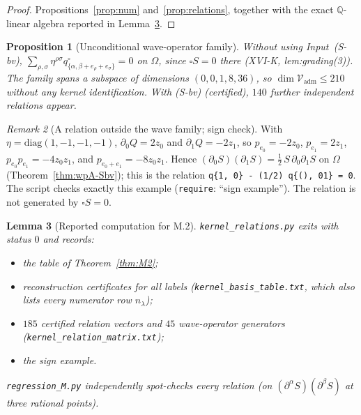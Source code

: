 \documentclass{article}
\newtheorem{proposition}{Proposition}
\newtheorem{lemma}[proposition]{Lemma}
\theoremstyle{remark}
\newtheorem{remark}[proposition]{Remark}
\begin{document}
\begin{proof}
Propositions~\ref{prop:num} and~\ref{prop:relations}, together with the exact $\mathbb Q$-linear algebra reported in Lemma~\ref{lem:M2comp}.
\end{proof}

\begin{proposition}[Unconditional wave-operator family]
\label{prop:wave}
Without using Input~(S-bv), $\sum_{\rho,\sigma}\eta^{\rho\sigma}q^\circ_{\{\alpha,\beta+e_\rho+e_\sigma\}}=0$ on $\Omega$, since $\square S=0$ there (XVI-K, lem:grading(3)).
The family spans a subspace of dimensions $(0,0,1,8,36)$, so $\dim\mathcal V_{\mathrm{adm}}\le210$ without any kernel identification.
With (S-bv) (certified), $140$ further independent relations appear.
\end{proposition}

\begin{remark}[A relation outside the wave family; sign check]
With $\eta=\mathrm{diag}(1,-1,-1,-1)$, $\partial_0Q=2z_0$ and $\partial_1Q=-2z_1$, so $p_{e_0}=-2z_0$, $p_{e_1}=2z_1$, $p_{e_0}p_{e_1}=-4z_0z_1$, and $p_{e_0+e_1}=-8z_0z_1$.
Hence $(\partial_0S)(\partial_1S)=\tfrac12\,S\,\partial_0\partial_1S$ on $\Omega$ (Theorem~\ref{thm:wpA-Sbv}); this is the relation \texttt{q\{1, 0\} - (1/2) q\{(), 01\} = 0}.
The script checks exactly this example (\texttt{require}: ``sign example'').
The relation is not generated by $\square S=0$.
\end{remark}

\begin{lemma}[Reported computation for M.2]
\label{lem:M2comp}
\texttt{kernel\_relations.py} exits with status $0$ and records:
\begin{itemize}
\item the table of Theorem~\ref{thm:M2};
\item reconstruction certificates for all labels (\texttt{kernel\_basis\_table.txt}, which also lists every numerator row $n_\lambda$);
\item $185$ certified relation vectors and $45$ wave-operator generators (\texttt{kernel\_relation\_matrix.txt});
\item the sign example.
\end{itemize}
\texttt{regression\_M.py} independently spot-checks every relation (on $(\partial^\alpha S)(\partial^\beta S)$ at three rational points).
\end{lemma}
\end{document}
